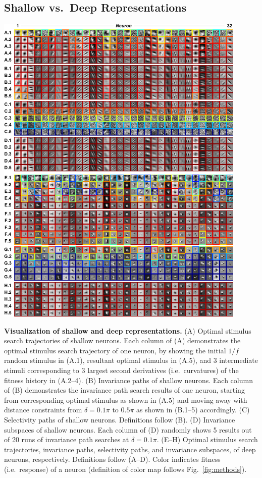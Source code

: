 

\subsection*{Shallow vs.~Deep Representations}

\begin{FPfigure} %
\begin{minipage}{\textwidth} \centering \includegraphics[width=0.9\textwidth]{Figs/pic1.pdf} \end{minipage}
\caption{
{\bf Visualization of shallow and deep representations.} (A) Optimal stimulus search trajectories of shallow neurons. Each column of (A) demonstrates the optimal stimulus search trajectory of one neuron, by showing the initial ${1}/{f}$ random stimulus in (A.1), resultant optimal stimulus in (A.5), and 3 intermediate stimuli corresponding to 3 largest second derivatives (i.e.~curvatures) of the fitness history in (A.2--4). (B) Invariance paths of shallow neurons. Each column of (B) demonstrates the invariance path search results of one neuron, starting from corresponding optimal stimulus as shown in (A.5) and moving away with distance constraints from $\delta = 0.1\pi$ to $0.5\pi$ as shown in (B.1--5) accordingly. (C) Selectivity paths of shallow neurons. Definitions follow (B). (D) Invariance subspaces of shallow neurons. Each column of (D) randomly shows 5 results out of 20 runs of invariance path searches at $\delta = 0.1\pi$. (E--H) Optimal stimulus search trajectories, invariance paths, selectivity paths, and invariance subspaces, of deep neurons, respectively. Definitions follow (A--D). Color indicates fitness (i.e.~response) of a neuron (definition of color map follows Fig.~\ref{fig:methods}).}

\end{FPfigure}
